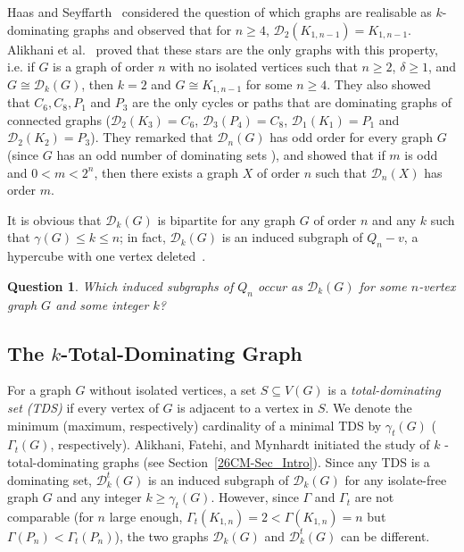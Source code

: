 \documentclass[12pt]{article}%
\newtheorem{question}{Question}[section]
\begin{document}


Haas and Seyffarth~\cite{26CM-HS2014} considered the question of which graphs
are realisable as $k$-dominating graphs and observed that for $n\geq4$,
$\mathcal{D}_{2}(K_{1,n-1})=K_{1,n-1}$. Alikhani et al.~\cite{26CM-davood}
proved that these stars are the only graphs with this property, i.e. if $G$ is
a graph of order $n$ with no isolated vertices such that $n\geq2$, $\delta
\geq1$, and $G\cong\mathcal{D}_{k}(G)$, then $k=2$ and $G\cong K_{1,n-1}$ for
some $n\geq4$. They also showed that $C_{6},C_{8},P_{1}$ and $P_{3}$ are the
only cycles or paths that are dominating graphs of connected graphs
($\mathcal{D}_{2}(K_{3})=C_{6}$, $\mathcal{D}_{3}(P_{4})=C_{8}$,
$\mathcal{D}_{1}(K_{1})=P_{1}$ and $\mathcal{D}_{2}(K_{2})=P_{3}$). They
remarked that $\mathcal{D}_{n}(G)$ has odd order for every graph $G$ (since
$G$ has an odd number of dominating sets \cite{26CM-BCS}), and showed that if
$m$ is odd and $0<m<2^{n}$, then there exists a graph $X$ of order $n$ such
that $\mathcal{D}_{n}(X)$ has order $m$.

It is obvious that $\mathcal{D}_{k}(G)$ is bipartite for any graph $G$ of
order $n$ and any $k$ such that $\gamma(G)\leq k\leq n$; in fact,
$\mathcal{D}_{k}(G)$ is an induced subgraph of $Q_{n}-v$, a hypercube with one
vertex deleted~\cite{26CM-davood}.

\begin{question}
Which induced subgraphs of $Q_{n}$ occur as $\mathcal{D}_{k}(G)$ for some
$n$-vertex graph $G$ and some integer $k$?
\end{question}

\subsection{The $k$-Total-Dominating Graph}

\label{Sec_k_TotalDom}

For a graph $G$ without isolated vertices, a set $S\subseteq V(G)$ is a
\emph{total-dominating set (TDS) }if every vertex of $G$ is adjacent to a
vertex in $S$. We denote the minimum (maximum, respectively) cardinality of a
minimal TDS by $\gamma_{t}(G)$ ($\Gamma_{t}(G)$, respectively). Alikhani,
Fatehi, and Mynhardt \cite{26CM-AFM} initiated the study of \emph{$k$%
}-total-dominating graphs (see Section~\ref{26CM-Sec_Intro}). Since any TDS is
a dominating set, $\mathcal{D}_{k}^{t}(G)$ is an induced subgraph of
$\mathcal{D}_{k}(G)$ for any isolate-free graph $G$ and any integer
$k\geq\gamma_{t}(G)$. However, since $\Gamma$ and $\Gamma_{t}$ are not
comparable (for $n$ large enough, $\Gamma_{t}(K_{1,n})=2<\Gamma(K_{1,n})=n$
but $\Gamma(P_{n})<\Gamma_{t}(P_{n})$), the two graphs $\mathcal{D}_{k}(G)$
and $\mathcal{D}_{k}^{t}(G)$ can be different.
\end{document}
